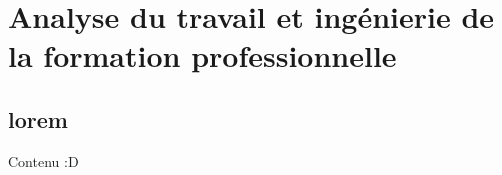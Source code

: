 \part{Analyse du travail et ingénierie de la formation professionnelle}
\chapter{lorem}
Contenu :D %